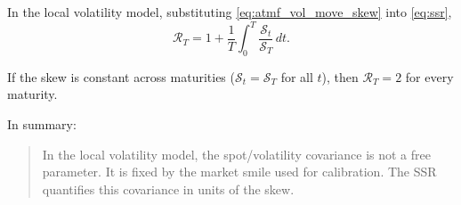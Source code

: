 In the local volatility model, substituting \eqref{eq:atmf_vol_move_skew} into \eqref{eq:ssr},
\begin{equation}\label{eq:ssr_local_vol}
    \mathcal{R}_T = 1 + \frac{1}{T}\int_0^T \frac{\mathcal{S}_t}{\mathcal{S}_T}\,dt .
\end{equation}

If the skew is constant across maturities ($\mathcal{S}_t = \mathcal{S}_T$ for all $t$),
then $\mathcal{R}_T = 2$ for every maturity.

In summary:
\begin{quote}
    In the local volatility model, the spot/volatility covariance is not a free parameter.
    It is fixed by the market smile used for calibration.
    The SSR quantifies this covariance in units of the skew.
\end{quote}